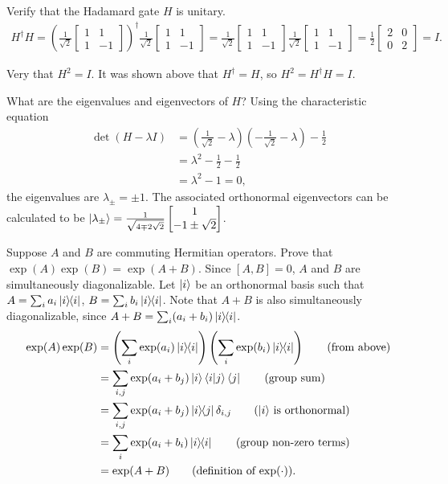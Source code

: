  Verify that the Hadamard gate $H$ is unitary.
\Soln
\begin{align*}
	H^\dagger H = \left(\frac{1}{\sqrt{2}} \begin{bmatrix}
	1 & 1 \\
	1 & -1
	\end{bmatrix}\right)^\dagger
	\frac{1}{\sqrt{2}} \begin{bmatrix}
	1 & 1 \\
	1 & -1
	\end{bmatrix}
	=
	\frac{1}{\sqrt{2}} \begin{bmatrix}
	1 & 1 \\
	1 & -1
	\end{bmatrix}
	\frac{1}{\sqrt{2}} \begin{bmatrix}
	1 & 1 \\
	1 & -1
	\end{bmatrix}
	=
	\frac{1}{2} \begin{bmatrix}
	2 & 0 \\
	0 & 2
	\end{bmatrix}
	=
	I.
\end{align*}

Very that $H^2=I$.
\Soln It was shown above that $H^\dagger=H$, so $H^2=H^\dagger H= I$.

 What are the eigenvalues and eigenvectors of $H$?
\Soln Using the characteristic equation \begin{align*}
	\det \left(H - \lambda I\right) &= \left(\frac{1}{\sqrt{2}} - \lambda \right) \left(- \frac{1}{\sqrt{2}} - \lambda \right) - \frac{1}{2}\\
		&= \lambda^2 - \frac{1}{2} - \frac{1}{2}\\
		&= \lambda^2 - 1 =0,
\end{align*}
the eigenvalues are $\lambda_\pm = \pm 1$. The associated orthonormal eigenvectors can be calculated to be $\ket{\lambda_\pm} = \frac{1}{\sqrt{4 \mp 2 \sqrt{2}}} \begin{bmatrix}
1 \\
-1 \pm \sqrt{2}
\end{bmatrix} $.

 Suppose $A$ and $B$ are commuting Hermitian operators.  Prove that $\exp(A)\exp(B)=\exp(A+B)$.
\Soln
Since $[A, B] = 0$, $A$ and $B$ are simultaneously diagonalizable. Let $\ket{i}$ be an orthonormal basis such that $A = \sum_i a_i \ket{i}\hspace{-1mm} \bra{i}$, $B = \sum_i b_i \ket{i}\hspace{-1mm} \bra{i}$.  Note that $A+B$ is also simultaneously diagonalizable, since $A+B = \sum_i (a_i+b_i)\ket{i}\hspace{-1mm} \bra{i}$.
\begin{align*}
	\exp (A) \exp (B) &= \left(\sum_i \exp (a_i) \kb{i}\right) \left(\sum_i \exp (b_i) \kb{i}\right) \tag{from above} \\
		&= \sum_{i,j} \exp (a_i + b_j) \ket{i} \braket{i | j} \bra{j} \tag{group sum}\\
		&= \sum_{i,j} \exp (a_i + b_j) \kbt{i}{j} \delta_{i, j} \tag{$\ket{i}$ is orthonormal}\\
		&= \sum_i \exp (a_i +  b_i) \kb{i}\tag{group non-zero terms}\\
		&= \exp (A+B) \tag{definition of $\exp(\cdot)$}.
\end{align*}

